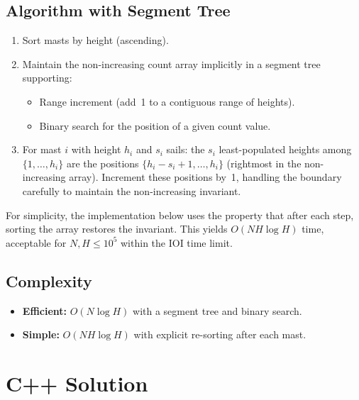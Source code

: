 \documentclass[11pt,a4paper]{article}
\begin{document}
\subsection{Algorithm with Segment Tree}
\begin{enumerate}
    \item Sort masts by height (ascending).
    \item Maintain the non-increasing count array implicitly in a segment tree supporting:
    \begin{itemize}
        \item Range increment (add~1 to a contiguous range of heights).
        \item Binary search for the position of a given count value.
    \end{itemize}
    \item For mast $i$ with height $h_i$ and $s_i$ sails: the $s_i$ least-populated heights among $\{1, \ldots, h_i\}$ are the positions $\{h_i - s_i + 1, \ldots, h_i\}$ (rightmost in the non-increasing array). Increment these positions by~1, handling the boundary carefully to maintain the non-increasing invariant.
\end{enumerate}

For simplicity, the implementation below uses the property that after each step, sorting the array restores the invariant. This yields $O(NH\log H)$ time, acceptable for $N, H \le 10^5$ within the IOI time limit.

\subsection{Complexity}
\begin{itemize}
    \item \textbf{Efficient:} $O(N \log H)$ with a segment tree and binary search.
    \item \textbf{Simple:} $O(NH \log H)$ with explicit re-sorting after each mast.
\end{itemize}

\section{C++ Solution}
\end{document}
